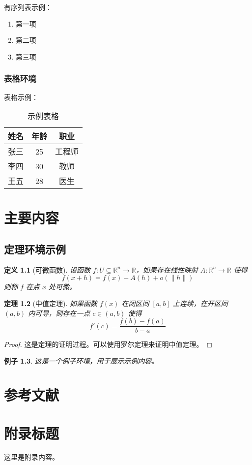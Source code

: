 \documentclass[fontsize=12pt, paper=a4, twoside, openright, DIV=calc]{scrbook}
\theoremstyle{break}
\newtheorem{theorem}{定理}[chapter]
\newtheorem{definition}[theorem]{定义}
\newtheorem{example}[theorem]{例子}
\begin{document}
有序列表示例：
\begin{enumerate}
\item 第一项
\item 第二项
\item 第三项
\end{enumerate}

\subsection{表格环境}

表格示例：
\begin{table}[htbp]
\centering
\caption{示例表格}
\begin{tabular}{|c|c|c|}
\hline
姓名 & 年龄 & 职业 \\
\hline
张三 & 25 & 工程师 \\
李四 & 30 & 教师 \\
王五 & 28 & 医生 \\
\hline
\end{tabular}
\end{table}

\chapter{主要内容}

\section{定理环境示例}

\begin{definition}[可微函数]
设函数 $f: U \subseteq \mathbb{R}^n \to \mathbb{R}$，如果存在线性映射 $A: \mathbb{R}^n \to \mathbb{R}$ 使得
\[
f(x + h) = f(x) + A(h) + o(\|h\|)
\]
则称 $f$ 在点 $x$ 处可微。
\end{definition}

\begin{theorem}[中值定理]
如果函数 $f(x)$ 在闭区间 $[a, b]$ 上连续，在开区间 $(a, b)$ 内可导，则存在一点 $c \in (a, b)$ 使得
\[
f'(c) = \frac{f(b) - f(a)}{b - a}
\]
\end{theorem}

\begin{proof}
这是定理的证明过程。可以使用罗尔定理来证明中值定理。
\end{proof}

\begin{example}
这是一个例子环境，用于展示示例内容。
\end{example}

\backmatter
\chapter{参考文献}

\nocite{*} %

\appendix
\chapter{附录标题}

这里是附录内容。
\end{document}
